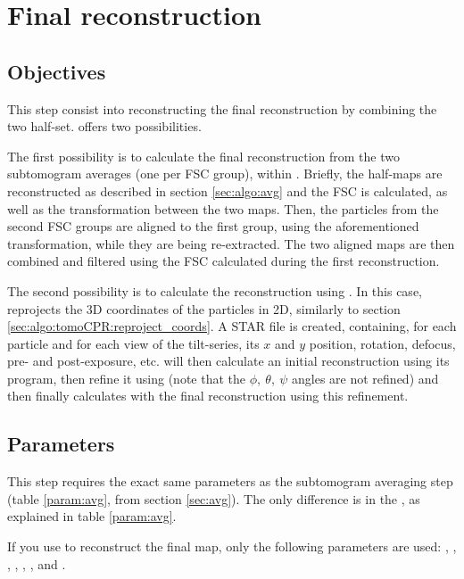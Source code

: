 \section{Final reconstruction} \label{sec:final_map}

\subsection{Objectives}

This step consist into reconstructing the final reconstruction by combining the two half-set. {\emClarity} offers two possibilities.

The first possibility is to calculate the final reconstruction from the two subtomogram averages (one per FSC group), within {\emClarity}. Briefly, the half-maps are reconstructed as described in section \ref{sec:algo:avg} and the FSC is calculated, as well as the transformation between the two maps. Then, the particles from the second FSC groups are aligned to the first group, using the aforementioned transformation, while they are being re-extracted. The two aligned maps are then combined and filtered using the FSC calculated during the first reconstruction.

The second possibility is to calculate the reconstruction using {\cisTEM}. In this case, {\emClarity} reprojects the 3D coordinates of the particles in 2D, similarly to section \ref{sec:algo:tomoCPR:reproject_coords}. A {\cisTEM} STAR file is created, containing, for each particle and for each view of the tilt-series, its $x$ and $y$ position, rotation, defocus, pre- and post-exposure, etc. {\cisTEM} will then calculate an initial reconstruction using its  program, then refine it using  (note that the $\phi,\ \theta,\ \psi$ angles are not refined) and then finally calculates with  the final reconstruction using this refinement.

\subsection{Parameters}

This step requires the exact same parameters as the subtomogram averaging step (table \ref{param:avg}, from section \ref{sec:avg}). The only difference is in the , as explained in table \ref{param:avg}.

If you use {\cisTEM} to reconstruct the final map, only the following parameters are used: , , , , , ,  and .


